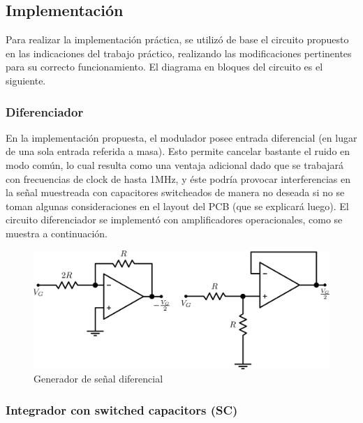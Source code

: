 \documentclass[assd_tp3_main.tex]{subfiles}
\begin{document}
\subsection{Implementación}

Para realizar la implementación práctica, se utilizó de base el circuito propuesto en las indicaciones del trabajo práctico, realizando las modificaciones pertinentes para su correcto funcionamiento. El diagrama en bloques del circuito es el siguiente.


\subsubsection{Diferenciador}

En la implementación propuesta, el modulador posee entrada diferencial (en lugar de una sola entrada referida a masa). Esto permite cancelar bastante el ruido en modo común, lo cual resulta como una ventaja adicional dado que se trabajará con frecuencias de clock de hasta 1MHz, y éste podría provocar interferencias en la señal muestreada con capacitores switcheados de manera no deseada si no se toman algunas consideraciones en el layout del PCB (que se explicará luego). El circuito diferenciador se implementó con amplificadores operacionales, como se muestra a continuación.

\begin{figure}[!ht]
\begin{centering}
\includegraphics[scale=0.5]{images/ej5/diferenciador.png}
\par\end{centering}
\caption{Generador de señal diferencial}
\end{figure}

\subsubsection{Integrador con switched capacitors (SC)}
\end{document}

